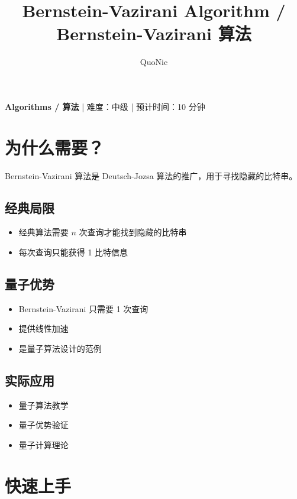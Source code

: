 \documentclass[12pt,a4paper]{article}
\title{Bernstein-Vazirani Algorithm / Bernstein-Vazirani 算法}
\author{QuoNic}
\date{}
\begin{document}
\maketitle

\begin{center}
\textbf{Algorithms / 算法} | 难度：中级 | 预计时间：10 分钟
\end{center}

\tableofcontents
\newpage

\section{为什么需要？}

Bernstein-Vazirani 算法是 Deutsch-Jozsa 算法的推广，用于寻找隐藏的比特串。

\subsection{经典局限}
\begin{itemize}
  \item 经典算法需要 $n$ 次查询才能找到隐藏的比特串
  \item 每次查询只能获得 1 比特信息
\end{itemize}

\subsection{量子优势}
\begin{itemize}
  \item Bernstein-Vazirani 只需要 1 次查询
  \item 提供线性加速
  \item 是量子算法设计的范例
\end{itemize}

\subsection{实际应用}
\begin{itemize}
  \item 量子算法教学
  \item 量子优势验证
  \item 量子计算理论
\end{itemize}

\section{快速上手}
\end{document}
